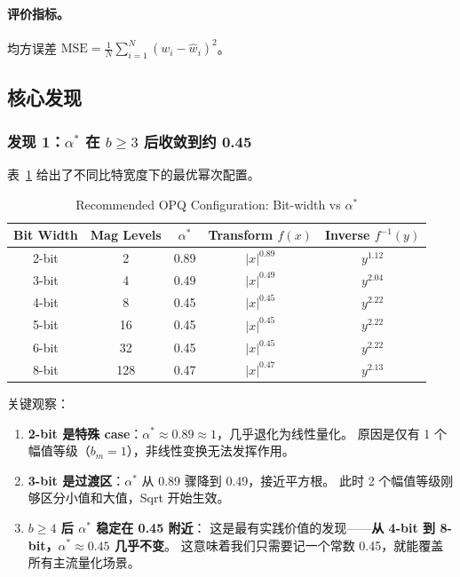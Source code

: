 \paragraph{评价指标。}
均方误差 $\text{MSE} = \frac{1}{N}\sum_{i=1}^{N}(w_i - \hat{w}_i)^2$。

\subsection{核心发现}

\subsubsection{发现 1：$\alpha^*$ 在 $b \geq 3$ 后收敛到约 0.45}

表~\ref{tab:opq_config} 给出了不同比特宽度下的最优幂次配置。

\begin{table}[h]
\centering
\caption{Recommended OPQ Configuration: Bit-width vs $\alpha^*$}
\label{tab:opq_config}
\begin{tabular}{c|c|c|c|c}
\hline
Bit Width & Mag Levels & $\alpha^*$ & Transform $f(x)$ & Inverse $f^{-1}(y)$ \\
\hline
2-bit & 2 & 0.89 & $|x|^{0.89}$ & $y^{1.12}$ \\
3-bit & 4 & 0.49 & $|x|^{0.49}$ & $y^{2.04}$ \\
4-bit & 8 & 0.45 & $|x|^{0.45}$ & $y^{2.22}$ \\
5-bit & 16 & 0.45 & $|x|^{0.45}$ & $y^{2.22}$ \\
6-bit & 32 & 0.45 & $|x|^{0.45}$ & $y^{2.22}$ \\
8-bit & 128 & 0.47 & $|x|^{0.47}$ & $y^{2.13}$ \\
\hline
\end{tabular}
\end{table}

关键观察：
\begin{enumerate}
\item \textbf{2-bit 是特殊 case}：$\alpha^* \approx 0.89 \approx 1$，几乎退化为线性量化。
  原因是仅有 1 个幅值等级（$b_m=1$），非线性变换无法发挥作用。
\item \textbf{3-bit 是过渡区}：$\alpha^*$ 从 0.89 骤降到 0.49，接近平方根。
  此时 2 个幅值等级刚够区分小值和大值，Sqrt 开始生效。
\item \textbf{$b \geq 4$ 后 $\alpha^*$ 稳定在 0.45 附近}：
  这是最有实践价值的发现——\textbf{从 4-bit 到 8-bit，$\alpha^* \approx 0.45$ 几乎不变}。
  这意味着我们只需要记一个常数 0.45，就能覆盖所有主流量化场景。
\end{enumerate}

